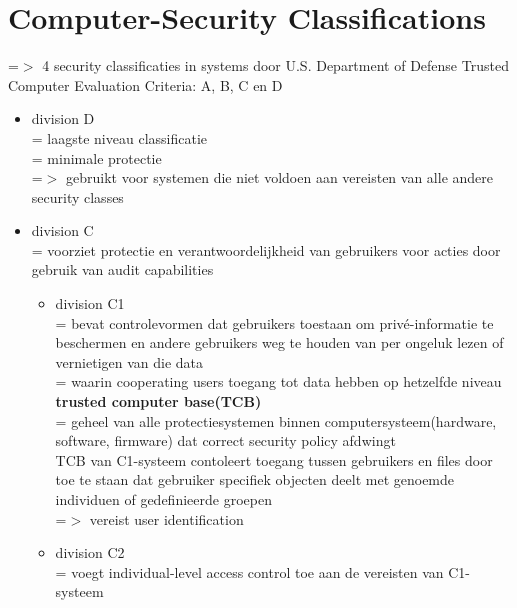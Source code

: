 \documentclass{report}
\begin{document}
\section{Computer-Security Classifications}
=$>$ 4 security classificaties in systems door U.S. Department of Defense Trusted Computer Evaluation Criteria: A, B, C en D
\begin{itemize}
\item division D
\\= laagste niveau classificatie
\\= minimale protectie
\\=$>$ gebruikt voor systemen die niet voldoen aan vereisten van alle andere security classes
\item division C
\\= voorziet protectie en verantwoordelijkheid van gebruikers voor acties door gebruik van audit capabilities
\begin{itemize}
\item division C1
\\= bevat controlevormen dat gebruikers toestaan om priv\'e-informatie te beschermen en andere gebruikers weg te houden van per ongeluk lezen of vernietigen van die data
\\= waarin cooperating users toegang tot data hebben op hetzelfde niveau
\\\textbf{trusted computer base(TCB)}
\\= geheel van alle protectiesystemen binnen computersysteem(hardware, software, firmware) dat correct security policy afdwingt
\\ TCB van C1-systeem contoleert toegang tussen gebruikers en files door toe te staan dat gebruiker specifiek objecten deelt met genoemde individuen of gedefinieerde groepen
\\=$>$ vereist user identification
\item division C2
\\= voegt individual-level access control toe aan de vereisten van C1-systeem


\end{itemize}
\end{itemize}
\end{document}
